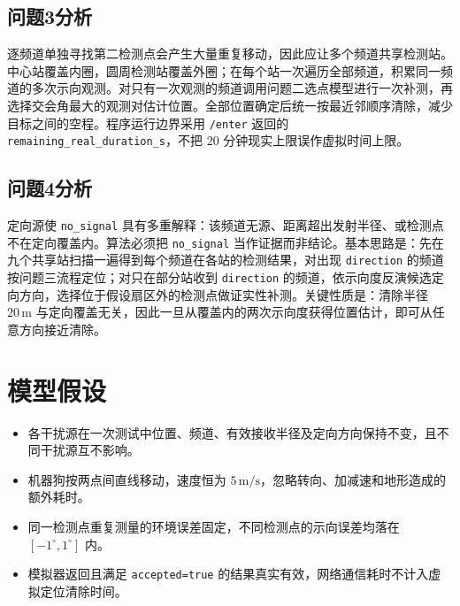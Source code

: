 \documentclass[12pt,a4paper]{ctexart}
\begin{document}
\subsection{问题3分析}
逐频道单独寻找第二检测点会产生大量重复移动，因此应让多个频道共享检测站。中心站覆盖内圈，圆周检测站覆盖外圈；在每个站一次遍历全部频道，积累同一频道的多次示向观测。对只有一次观测的频道调用问题二选点模型进行一次补测，再选择交会角最大的观测对估计位置。全部位置确定后统一按最近邻顺序清除，减少目标之间的空程。程序运行边界采用 \texttt{/enter} 返回的 \texttt{remaining\_real\_duration\_s}，不把 $20$ 分钟现实上限误作虚拟时间上限。

\subsection{问题4分析}
定向源使 \texttt{no\_signal} 具有多重解释：该频道无源、距离超出发射半径、或检测点不在定向覆盖内。算法必须把 \texttt{no\_signal} 当作证据而非结论。基本思路是：先在九个共享站扫描一遍得到每个频道在各站的检测结果，对出现 \texttt{direction} 的频道按问题三流程定位；对只在部分站收到 \texttt{direction} 的频道，依示向度反演候选定向方向，选择位于假设扇区外的检测点做证实性补测。关键性质是：清除半径 $20\,\mathrm{m}$ 与定向覆盖无关，因此一旦从覆盖内的两次示向度获得位置估计，即可从任意方向接近清除。

\section{模型假设}
\begin{itemize}[itemindent=2em]
  \item 各干扰源在一次测试中位置、频道、有效接收半径及定向方向保持不变，且不同干扰源互不影响。
  \item 机器狗按两点间直线移动，速度恒为 $5\,\mathrm{m/s}$，忽略转向、加减速和地形造成的额外耗时。
  \item 同一检测点重复测量的环境误差固定，不同检测点的示向误差均落在 $[-1^\circ,1^\circ]$ 内。
  \item 模拟器返回且满足 \texttt{accepted=true} 的结果真实有效，网络通信耗时不计入虚拟定位清除时间。
\end{itemize}
\end{document}
